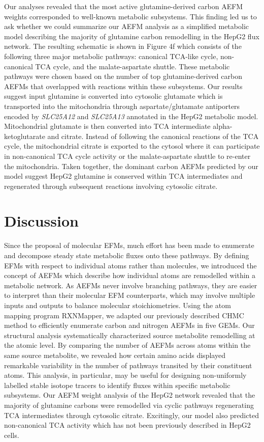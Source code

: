 \documentclass[12pt]{article}
\begin{document}
Our analyses revealed that the most active glutamine-derived carbon AEFM
weights corresponded to well-known metabolic subsystems. This finding led
us to ask whether we could summarize our AEFM analysis as a simplified
metabolic model describing the majority of glutamine carbon remodelling in
the HepG2 flux network. The resulting schematic is shown in Figure 4f
which consists of the following three major metabolic pathways: canonical
TCA-like cycle, non-canonical TCA cycle, and the malate-aspartate shuttle.
These metabolic pathways were chosen based on the number of top
glutamine-derived carbon AEFMs that overlapped with reactions within these
subsystems. Our results suggest input glutamine is converted into
cytosolic glutamate which is transported into the mitochondria through
aspartate/glutamate antiporters encoded by \textit{SLC25A12} and
\textit{SLC25A13} annotated in the HepG2 metabolic model. Mitochondrial
glutamate is then converted into TCA intermediate alpha-ketoglutarate and
citrate. Instead of following the canonical reactions of the TCA cycle,
the mitochondrial citrate is exported to the cytosol where it can
participate in non-canonical TCA cycle activity or the malate-aspartate
shuttle to re-enter the mitochondria. Taken together, the dominant carbon
AEFMs predicted by our model suggest HepG2 glutamine is conserved within
TCA intermediates and regenerated through subsequent reactions involving
cytosolic citrate.

\section*{Discussion}

Since the proposal of molecular EFMs, much effort has been made to
enumerate and decompose steady state metabolic fluxes onto these pathways.
By defining EFMs with respect to individual atoms rather than molecules,
we introduced the concept of AEFMs which describe how individual atoms are
remodelled within a metabolic network. As AEFMs never involve branching
pathways, they are easier to interpret than their molecular EFM
counterparts, which may involve multiple inputs and outputs to balance
molecular stoichiometries. Using the atom mapping program RXNMapper, we
adapted our previously described CHMC method to efficiently enumerate
carbon and nitrogen AEFMs in five GEMs. Our structural analysis
systematically characterized source metabolite remodelling at the atomic
level. By comparing the number of AEFMs across atoms within the same
source metabolite, we revealed how certain amino acids displayed
remarkable variability in the number of pathways transited by their
constituent atoms. This analysis, in particular, may be useful for
designing non-uniformly labelled stable isotope tracers to identify fluxes
within specific metabolic subsystems. Our AEFM weight analysis of
the HepG2 network revealed that the majority of glutamine carbons were
remodelled via cyclic pathways regenerating TCA intermediates through
cytosolic citrate. Excitingly, our model also predicted non-canonical TCA
activity which has not been previously described in HepG2 cells.
\end{document}
